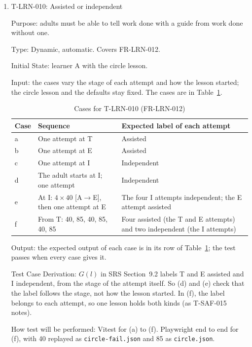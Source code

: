\documentclass[12pt, titlepage]{article}
\newcommand{\testitem}[1]{\item #1\par\nopagebreak}
\begin{document}
\begin{enumerate}
How test will be performed: Vitest calls the evaluation function for each
file, lesson and stage. Playwright replays (a) to (e) at each stage. (f) is
done by hand at PH-1.

\testitem{T-LRN-010: Assisted or independent}

Purpose: adults must be able to tell work done with a guide from work done
without one.

Type: Dynamic, automatic. Covers FR-LRN-012.

Initial State: learner A with the circle lesson.

Input: the cases vary the stage of each attempt and how the lesson
started; the circle lesson and the defaults stay fixed. The cases are in
Table~\ref{tab:t-lrn-010}.

\begin{table}[htbp]
\centering\small
\caption{Cases for T-LRN-010 (FR-LRN-012)}
\label{tab:t-lrn-010}
\begin{tabularx}{\textwidth}{@{}l >{\raggedright\arraybackslash}X
  >{\raggedright\arraybackslash}X@{}}
\toprule
\textbf{Case} & \textbf{Sequence} &
\textbf{Expected label of each attempt}\\
\midrule
a & One attempt at T & Assisted\\
b & One attempt at E & Assisted\\
c & One attempt at I & Independent\\
d & The adult starts at I; one attempt & Independent\\
e & At I: $4 \times 40$ [A$\to$E], then one attempt at E & The four I
attempts independent; the E attempt assisted\\
f & From T: 40, 85, 40, 85, 40, 85 & Four assisted (the T and E attempts)
and two independent (the I attempts)\\
\bottomrule
\end{tabularx}
\end{table}

Output: the expected output of each case is in its row of
Table~\ref{tab:t-lrn-010}; the test passes when every case gives it.

Test Case Derivation: $G(l)$ in SRS Section~9.2 labels T and E assisted
and I independent, from the stage of the attempt itself. So (d) and (e)
check that the label follows the stage, not how the lesson started. In
(f), the label belongs to each attempt, so one lesson holds both kinds (as
T-SAF-015 notes).

How test will be performed: Vitest for (a) to (f). Playwright end to end
for (f), with 40 replayed as \texttt{circle-\allowbreak{}fail.json} and 85
as \texttt{circle.json}.


\end{enumerate}
\end{document}
